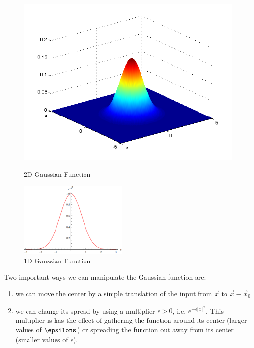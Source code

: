 \documentclass{article}
\begin{document}
\begin{figure}[h]
    \begin{minipage}{0.5\textwidth}
    \centering
    \includegraphics[width=\linewidth]{gauss2d.png}
    \caption{2D Gaussian Function}
    \end{minipage}
    \begin{minipage}{0.5\textwidth}
    \centering
    \includegraphics[width=\linewidth]{gauss1d.png}
    \caption{1D Gaussian Function}
    \end{minipage}
    \end{figure}


Two important ways we can manipulate the Gaussian function are:
\begin{enumerate}
    \item we can move the center by a simple translation of the input from $\vec{x}$ to $\vec{x} - \vec{x}_0$
    \item we can change its spread by using a multiplier $\epsilon> 0$, i.e. $e^{-\epsilon \Vert x \Vert^2}$. 
    This multiplier is has the effect of gathering the function around its center (larger values of $\epsilons$) or
    spreading the function out away from its center (smaller values of $\epsilon$).
\end{enumerate}
\end{document}
